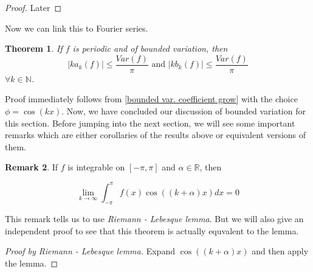 \documentclass[12pt]{amsart}
\newtheorem{theorem}{Theorem}[section]
\theoremstyle{definition}
\newtheorem{remark}[theorem]{Remark}
\newcommand{\NN}{{\mathbb N}} %
\newcommand{\RR}{{\mathbb R}} %
\begin{document}
\begin{proof}
    Later
\end{proof}


Now we can link this to Fourier series.
\begin{theorem}\label{growth of ceof. of bdd. var.}
    If $f$ is periodic and of bounded variation, then
    \[
    |ka_k(f)|\leq \frac{Var(f)}{\pi}  \text{ and }  |kb_k(f)| \leq \frac{Var(f)}{\pi}
    \]
    $\forall k \in \NN$.
\end{theorem}


Proof immediately follows from \ref{bounded var. coefficient grow} with the choice $\phi = \cos(kx)$. Now, we have concluded our discussion of bounded variation for this section. Before jumping into the next section, we will see some important remarks which are either corollaries of the results above or equivalent versions of them.


\begin{remark}\label{alternative riemann-lebesque lemma}
    If $f$ is integrable on $[-\pi, \pi]$ and $\alpha \in \RR$, then 




    \[
    \lim_{k \to \infty}\int_{-\pi}^{\pi}f(x)\cos((k+\alpha)x) dx = 0
    \]
\end{remark}


This remark tells us to use \emph{Riemann - Lebesque lemma}. But we will also give an independent proof to see that this theorem is actually equvalent to the lemma.


\begin{proof}[Proof by \textit{Riemann - Lebesque lemma}]
    Expand $\cos((k+\alpha)x)$ and then apply the lemma.
\end{proof}
\end{document}
